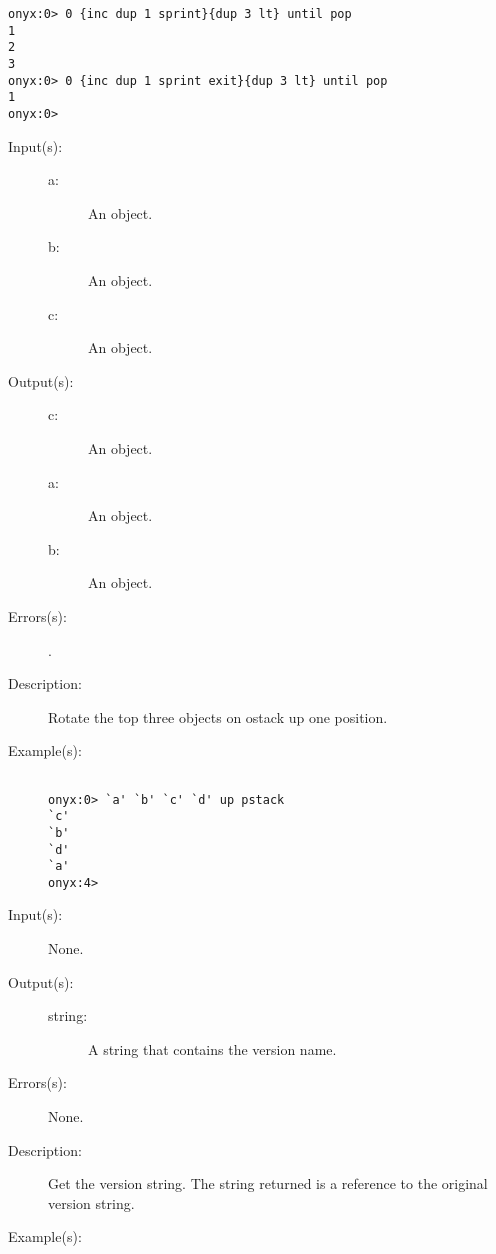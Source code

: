 \begin{description}
\begin{description}
\begin{verbatim}
onyx:0> 0 {inc dup 1 sprint}{dup 3 lt} until pop
1
2
3
onyx:0> 0 {inc dup 1 sprint exit}{dup 3 lt} until pop
1
onyx:0>
		\end{verbatim}
	\end{description}
\label{systemdict:up}
\item[{\onyxop{a b c}{up}{c a b}}: ]
	\begin{description}\item[]
	\item[Input(s): ]
		\begin{description}\item[]
		\item[a: ]
			An object.
		\item[b: ]
			An object.
		\item[c: ]
			An object.
		\end{description}
	\item[Output(s): ]
		\begin{description}\item[]
		\item[c: ]
			An object.
		\item[a: ]
			An object.
		\item[b: ]
			An object.
		\end{description}
	\item[Errors(s): ]
		\begin{description}\item[]
		\item[.]
		\end{description}
	\item[Description: ]
		Rotate the top three objects on ostack up one position.
	\item[Example(s): ]\begin{verbatim}

onyx:0> `a' `b' `c' `d' up pstack
`c'
`b'
`d'
`a'
onyx:4>
		\end{verbatim}
	\end{description}
\label{systemdict:version}
\item[{\onyxop{--}{version}{string}}: ]
	\begin{description}\item[]
	\item[Input(s): ] None.
	\item[Output(s): ]
		\begin{description}\item[]
		\item[string: ]
			A string that contains the version name.
		\end{description}
	\item[Errors(s): ] None.
	\item[Description: ]
		Get the version string.  The string returned is a reference to
		the original version string.
	\item[Example(s): ]\begin{verbatim}


\end{verbatim}
\end{description}
\end{description}
